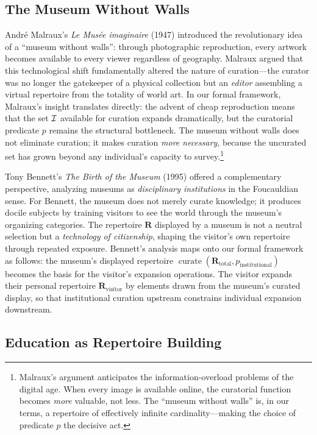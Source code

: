 \subsection*{The Museum Without Walls}

Andr\'{e} Malraux's \textit{Le Mus\'{e}e imaginaire} (1947) introduced the
revolutionary idea of a ``museum without walls'': through photographic
reproduction, every artwork becomes available to every viewer regardless
of geography.  Malraux argued that this technological shift fundamentally
altered the nature of curation---the curator was no longer the gatekeeper
of a physical collection but an \emph{editor} assembling a virtual
repertoire from the totality of world art.  In our formal framework,
Malraux's insight translates directly: the advent of cheap reproduction
means that the set $\mathcal{I}$ available for curation expands dramatically, but
the curatorial predicate $p$ remains the structural bottleneck.  The
museum without walls does not eliminate curation; it makes curation
\emph{more necessary}, because the uncurated set has grown beyond any
individual's capacity to survey.\footnote{Malraux's argument anticipates
the information-overload problems of the digital age.  When every image
is available online, the curatorial function becomes \emph{more} valuable,
not less.  The ``museum without walls'' is, in our terms, a repertoire
of effectively infinite cardinality---making the choice of predicate $p$
the decisive act.}

Tony Bennett's \textit{The Birth of the Museum} (1995) offered a
complementary perspective, analyzing museums as \emph{disciplinary
institutions} in the Foucauldian sense.  For Bennett, the museum does not
merely curate knowledge; it produces docile subjects by training visitors
to see the world through the museum's organizing categories.  The
repertoire $\mathbf{R}$ displayed by a museum is not a neutral selection
but a \emph{technology of citizenship}, shaping the visitor's own
repertoire through repeated exposure.  Bennett's analysis maps onto our
formal framework as follows: the museum's displayed repertoire
$\operatorname{curate}(\mathbf{R}_{\text{total}}, p_{\text{institutional}})$
becomes the basis for the visitor's expansion operations.  The visitor
expands their personal repertoire $\mathbf{R}_{\text{visitor}}$ by
elements drawn from the museum's curated display, so that institutional
curation upstream constrains individual expansion downstream.

\subsection*{Education as Repertoire Building}


